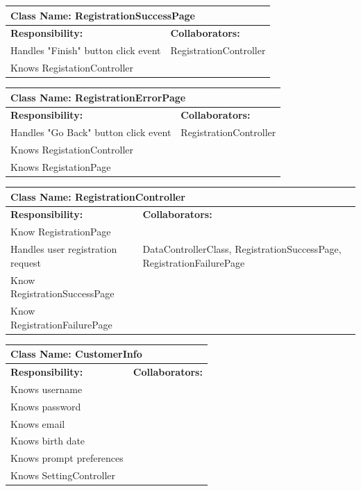\documentclass[]{article}
\begin{document}
	\begin{table}[H]
	\centering
	\begin{tabular}{|p{6cm}|p{6cm}|}
	\hline 
		\multicolumn{2}{|l|}{\textbf{Class Name: RegistrationSuccessPage}} \\
	\hline
	\textbf{Responsibility:} & \textbf{Collaborators:} \\
	\hline 
	Handles "Finish" button click event  & RegistrationController\\ \hline 
	Knows RegistationController &\\ \hline
	\end{tabular}
	\end{table}
	
	\begin{table}[H]
	\centering
	\begin{tabular}{|p{6cm}|p{6cm}|}
	\hline 
		\multicolumn{2}{|l|}{\textbf{Class Name: RegistrationErrorPage}} \\
	\hline
	\textbf{Responsibility:} & \textbf{Collaborators:} \\
	\hline 
	Handles "Go Back" button click event  & RegistrationController\\ \hline 
	Knows RegistationController &\\ \hline
	Knows RegistationPage &\\ \hline
	\end{tabular}
	\end{table}
		
	\begin{table}[H]
	\centering
	\begin{tabular}{|p{6cm}|p{6cm}|}
	\hline 
		\multicolumn{2}{|l|}{\textbf{Class Name: RegistrationController}} \\
	\hline
	\textbf{Responsibility:} & \textbf{Collaborators:} \\
	\hline
	Know RegistrationPage&\\ \hline
	Handles user registration request & DataControllerClass, RegistrationSuccessPage, RegistrationFailurePage\\ \hline
	Know RegistrationSuccessPage &\\ \hline
	Know RegistrationFailurePage &\\ \hline
	\end{tabular}
	\end{table}
	
	\begin{table}[H]
	\centering
	\begin{tabular}{|p{6cm}|p{6cm}|}
	\hline 
		\multicolumn{2}{|l|}{\textbf{Class Name: CustomerInfo}} \\
	\hline
	\textbf{Responsibility:} & \textbf{Collaborators:} \\
	\hline 
	Knows username&\\ \hline
	Knows password&\\ \hline 
	Knows email&\\ \hline 
	Knows birth date&\\ \hline 
	Knows prompt preferences &\\ \hline
	Knows SettingController &\\ \hline
	\end{tabular}
	\end{table}
		
\end{document}

